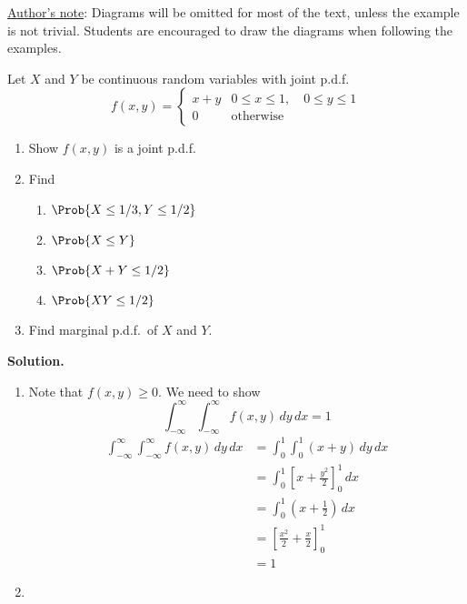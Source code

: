 \underline{Author's note}: Diagrams will be omitted for most of the text,
unless the example is not trivial. Students are encouraged
to draw the diagrams when following the examples.
\begin{Example}{}{}
    Let $ X $ and $ Y $ be continuous random variables
    with joint p.d.f.\
    \[ f(x,y)=
        \begin{cases}
            x+y & 0\le x\le 1,\quad 0\le y\le 1 \\
            0   & \text{otherwise}
        \end{cases} \]
    \begin{enumerate}[label=(\roman*)]
        \item Show $ f(x,y) $ is a joint p.d.f.\
        \item Find
              \begin{enumerate}[label=(\alph*)]
                  \item $ \Prob{X\le 1/3, Y\le 1/2} $
                  \item $ \Prob{X\le Y} $
                  \item $ \Prob{X+Y\le 1/2} $
                  \item $ \Prob{XY\le 1/2} $
              \end{enumerate}
        \item Find marginal p.d.f.\ of $ X $ and $ Y $.
    \end{enumerate}
    \textbf{Solution.}
    \begin{enumerate}[label=(\roman*)]
        \item Note that $ f(x,y)\ge 0 $. We need to show
              \[ \int_{-\infty}^{\infty} \int_{-\infty}^{\infty} f(x,y)\, d{y} \, d{x} =1 \]
              \begin{align*}
                  \int_{-\infty}^{\infty} \int_{-\infty}^{\infty} f(x,y)\, d{y} \, d{x}
                   & =\int_{0}^{1} \int_{0}^{1} (x+y)\, d{y} \, d{x}         \\
                   & =\int_{0}^{1} \left[ x+\frac{y^2}{2} \right]_0^1\, d{x} \\
                   & =\int_{0}^{1} \left( x+\frac{1}{2} \right)\, d{x}       \\
                   & =\left[ \frac{x^2}{2}  +\frac{x}{2}\right]_0^1          \\
                   & =1
              \end{align*}
        \item \begin{enumerate}[label=(\alph*)]

\end{enumerate}
\end{enumerate}
\end{Example}
